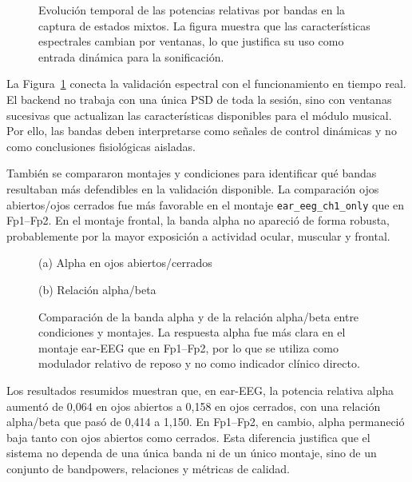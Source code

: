 \documentclass[../main.tex]{subfiles}
\begin{document}
\begin{figure}[htbp]
    \centering
    \caption{Evolución temporal de las potencias relativas por bandas en la captura de estados mixtos. La figura muestra que las características espectrales cambian por ventanas, lo que justifica su uso como entrada dinámica para la sonificación.}
    \label{fig:validacion_windowed_bandpowers}
\end{figure}

La Figura~\ref{fig:validacion_windowed_bandpowers} conecta la validación espectral con el funcionamiento en tiempo real. El backend no trabaja con una única PSD de toda la sesión, sino con ventanas sucesivas que actualizan las características disponibles para el módulo musical. Por ello, las bandas deben interpretarse como señales de control dinámicas y no como conclusiones fisiológicas aisladas.

También se compararon montajes y condiciones para identificar qué bandas resultaban más defendibles en la validación disponible. La comparación ojos abiertos/ojos cerrados fue más favorable en el montaje \texttt{ear\_eeg\_ch1\_only} que en Fp1--Fp2. En el montaje frontal, la banda alpha no apareció de forma robusta, probablemente por la mayor exposición a actividad ocular, muscular y frontal.

\begin{figure}[htbp]
    \centering
    \begin{minipage}{0.49\textwidth}
        \centering
        \small (a) Alpha en ojos abiertos/cerrados
    \end{minipage}
    \hfill
    \begin{minipage}{0.49\textwidth}
        \centering
        \small (b) Relación alpha/beta
    \end{minipage}
    \caption{Comparación de la banda alpha y de la relación alpha/beta entre condiciones y montajes. La respuesta alpha fue más clara en el montaje ear-EEG que en Fp1--Fp2, por lo que se utiliza como modulador relativo de reposo y no como indicador clínico directo.}
    \label{fig:validacion_alpha_alpha_beta}
\end{figure}

Los resultados resumidos muestran que, en ear-EEG, la potencia relativa alpha aumentó de 0,064 en ojos abiertos a 0,158 en ojos cerrados, con una relación alpha/beta que pasó de 0,414 a 1,150. En Fp1--Fp2, en cambio, alpha permaneció baja tanto con ojos abiertos como cerrados. Esta diferencia justifica que el sistema no dependa de una única banda ni de un único montaje, sino de un conjunto de bandpowers, relaciones y métricas de calidad.
\end{document}
